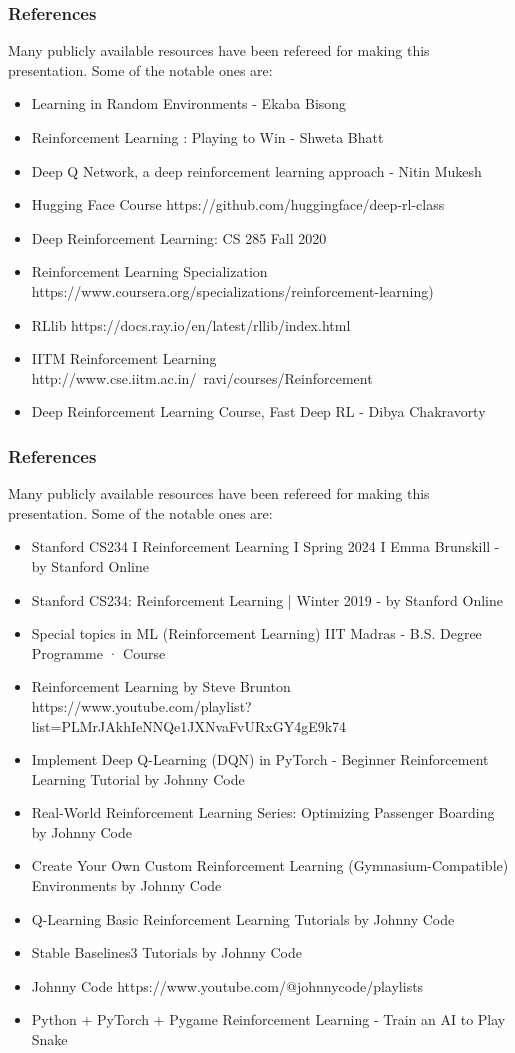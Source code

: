 \begin{frame}\frametitle{References}
Many publicly available resources have been refereed for making this presentation. Some of the notable ones are:
\footnotesize
\begin{itemize}
\item Learning in Random Environments - Ekaba Bisong
\item Reinforcement Learning : Playing to Win - Shweta Bhatt
\item Deep Q Network, a deep reinforcement learning approach - Nitin Mukesh
\item Hugging Face Course https://github.com/huggingface/deep-rl-class
\item Deep Reinforcement Learning: CS 285 Fall 2020
\item Reinforcement Learning Specialization https://www.coursera.org/specializations/reinforcement-learning)
\item RLlib https://docs.ray.io/en/latest/rllib/index.html
\item IITM Reinforcement Learning http://www.cse.iitm.ac.in/~ravi/courses/Reinforcement%
\item Deep Reinforcement Learning Course, Fast Deep RL - Dibya Chakravorty
\end{itemize}
\end{frame}


\begin{frame}\frametitle{References}
Many publicly available resources have been refereed for making this presentation. Some of the notable ones are:
\footnotesize
\begin{itemize}
\item Stanford CS234 I Reinforcement Learning I Spring 2024 I Emma Brunskill - by Stanford Online
\item Stanford CS234: Reinforcement Learning | Winter 2019 - by Stanford Online
\item Special topics in ML (Reinforcement Learning) IIT Madras - B.S. Degree Programme · Course
\item Reinforcement Learning by Steve Brunton https://www.youtube.com/playlist?list=PLMrJAkhIeNNQe1JXNvaFvURxGY4gE9k74
\item Implement Deep Q-Learning (DQN) in PyTorch - Beginner Reinforcement Learning Tutorial by Johnny Code
\item Real-World Reinforcement Learning Series: Optimizing Passenger Boarding by Johnny Code
\item Create Your Own Custom Reinforcement Learning (Gymnasium-Compatible) Environments by Johnny Code
\item Q-Learning Basic Reinforcement Learning Tutorials by Johnny Code
\item Stable Baselines3 Tutorials by Johnny Code
\item Johnny Code https://www.youtube.com/@johnnycode/playlists
\item Python + PyTorch + Pygame Reinforcement Learning - Train an AI to Play Snake
\end{itemize}
\end{frame}

